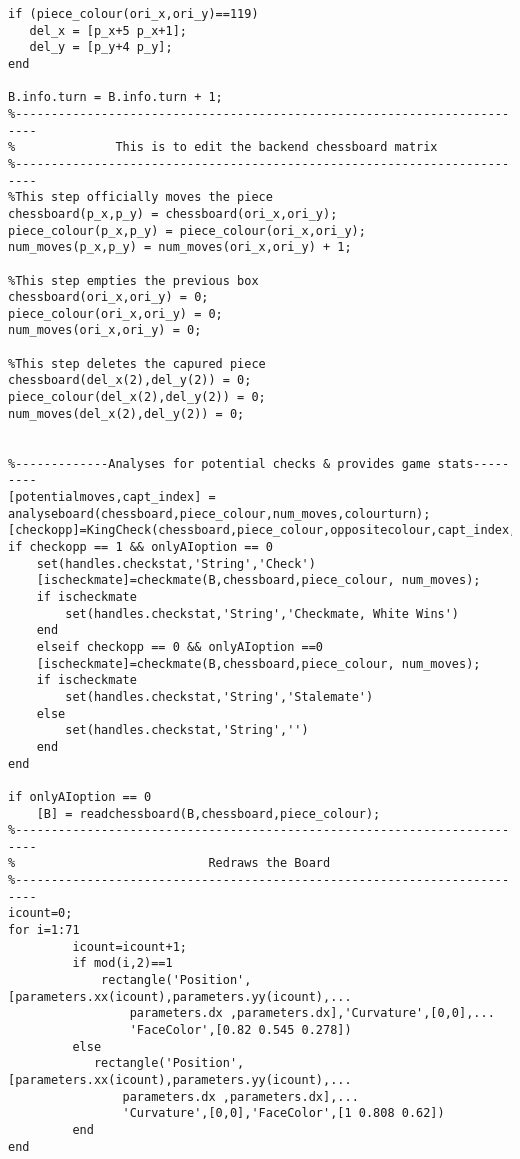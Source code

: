 \documentclass{article}
\begin{document}
\begin{lstlisting}
if (piece_colour(ori_x,ori_y)==119)    
   del_x = [p_x+5 p_x+1];
   del_y = [p_y+4 p_y];
end
            
B.info.turn = B.info.turn + 1;
%-------------------------------------------------------------------------
%              This is to edit the backend chessboard matrix
%-------------------------------------------------------------------------
%This step officially moves the piece
chessboard(p_x,p_y) = chessboard(ori_x,ori_y);
piece_colour(p_x,p_y) = piece_colour(ori_x,ori_y);
num_moves(p_x,p_y) = num_moves(ori_x,ori_y) + 1;

%This step empties the previous box
chessboard(ori_x,ori_y) = 0;
piece_colour(ori_x,ori_y) = 0;
num_moves(ori_x,ori_y) = 0;

%This step deletes the capured piece
chessboard(del_x(2),del_y(2)) = 0;
piece_colour(del_x(2),del_y(2)) = 0;
num_moves(del_x(2),del_y(2)) = 0;


%-------------Analyses for potential checks & provides game stats---------
[potentialmoves,capt_index] = analyseboard(chessboard,piece_colour,num_moves,colourturn);
[checkopp]=KingCheck(chessboard,piece_colour,oppositecolour,capt_index,potentialmoves);
if checkopp == 1 && onlyAIoption == 0
    set(handles.checkstat,'String','Check')
    [ischeckmate]=checkmate(B,chessboard,piece_colour, num_moves);
    if ischeckmate
        set(handles.checkstat,'String','Checkmate, White Wins')
    end
    elseif checkopp == 0 && onlyAIoption ==0
    [ischeckmate]=checkmate(B,chessboard,piece_colour, num_moves);
    if ischeckmate
        set(handles.checkstat,'String','Stalemate')
    else
        set(handles.checkstat,'String','')
    end
end

if onlyAIoption == 0
    [B] = readchessboard(B,chessboard,piece_colour);
%-------------------------------------------------------------------------
%                           Redraws the Board
%-------------------------------------------------------------------------
icount=0;
for i=1:71
         icount=icount+1;
         if mod(i,2)==1
             rectangle('Position',[parameters.xx(icount),parameters.yy(icount),...
                 parameters.dx ,parameters.dx],'Curvature',[0,0],...
                 'FaceColor',[0.82 0.545 0.278])
         else
            rectangle('Position',[parameters.xx(icount),parameters.yy(icount),...
                parameters.dx ,parameters.dx],...
                'Curvature',[0,0],'FaceColor',[1 0.808 0.62])             
         end
end


\end{lstlisting}
\end{document}

